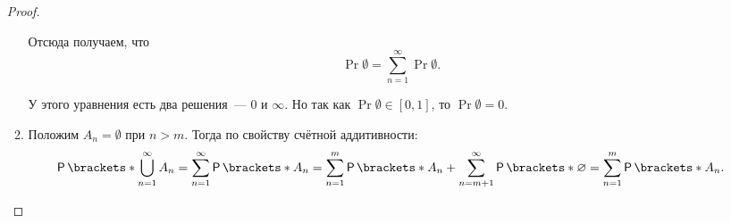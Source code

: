 \begin{itemize}
\begin{proof}
\begin{enumerate}
			Отсюда получаем, что
			\[
			\Pr{\emptyset} = \sum\limits_{n = 1}^{\infty}\Pr{\emptyset}.
			\]
			
			У этого уравнения есть два решения~--- \(0\) и \(\infty\). Но так как \(\Pr{\emptyset} \in [0, 1]\), то \(\Pr{\emptyset} = 0\).
			
			\item Положим \(A_n = \emptyset\) при \(n > m\). Тогда по свойству счётной аддитивности:
			\[
			\Pr{\bigcup\limits_{n = 1}^{\infty}A_n} = \sum\limits_{n = 1}^{\infty}\Pr{A_n} = \sum\limits_{n = 1}^{m}\Pr{A_n} + \sum\limits_{n = m + 1}^{\infty}\Pr{\emptyset} = \sum\limits_{n = 1}^{m}\Pr{A_n}.\qedhere
			\]
		\end{enumerate}
	\end{proof}
\end{itemize}

